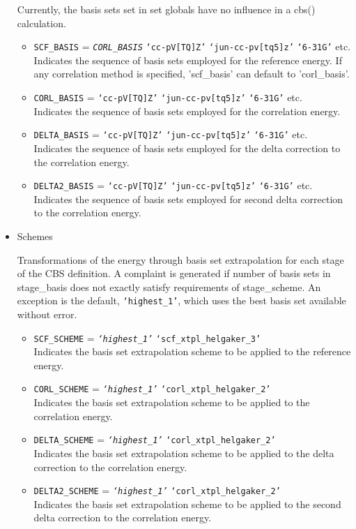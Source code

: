 \begin{itemize}
Currently, the basis sets set in set globals have no influence in a cbs() calculation.
\begin{itemize}
\item[] \texttt{SCF\_BASIS} = \texttt{\textit{CORL\_BASIS}} \textbar\; \texttt{`cc-pV[TQ]Z'} \textbar\; \texttt{`jun-cc-pv[tq5]z'} \textbar\; \texttt{`6-31G'} \textbar\; etc. \\
Indicates the sequence of basis sets employed for the reference energy. If any correlation method is specified, 'scf\_basis' can default to 'corl\_basis'.
\item[] \texttt{CORL\_BASIS} = \texttt{`cc-pV[TQ]Z'} \textbar\; \texttt{`jun-cc-pv[tq5]z'} \textbar\; \texttt{`6-31G'} \textbar\; etc. \\
Indicates the sequence of basis sets employed for the correlation energy.
\item[] \texttt{DELTA\_BASIS} = \texttt{`cc-pV[TQ]Z'} \textbar\; \texttt{`jun-cc-pv[tq5]z'} \textbar\; \texttt{`6-31G'} \textbar\; etc. \\
Indicates the sequence of basis sets employed for the delta correction to the correlation energy.
\item[] \texttt{DELTA2\_BASIS} = \texttt{`cc-pV[TQ]Z'} \textbar\; \texttt{`jun-cc-pv[tq5]z'} \textbar\; \texttt{`6-31G'} \textbar\; etc. \\
Indicates the sequence of basis sets employed for second delta correction to the correlation energy.
\end{itemize}

\item Schemes

Transformations of the energy through basis set extrapolation for each stage of the CBS definition. 
A complaint is generated if number of basis sets in stage\_basis does not exactly satisfy 
requirements of stage\_scheme. 
An exception is the default, \texttt{`highest\_1'}, which uses the best basis set available without error.
\begin{itemize}
\item[] \texttt{SCF\_SCHEME} = \texttt{\textit{`highest\_1'}} \textbar\; \texttt{`scf\_xtpl\_helgaker\_3'} \\
Indicates the basis set extrapolation scheme to be applied to the reference energy.
\item[] \texttt{CORL\_SCHEME} = \texttt{\textit{`highest\_1'}} \textbar\; \texttt{`corl\_xtpl\_helgaker\_2'} \\
Indicates the basis set extrapolation scheme to be applied to the correlation energy.
\item[] \texttt{DELTA\_SCHEME} = \texttt{\textit{`highest\_1'}} \textbar\; \texttt{`corl\_xtpl\_helgaker\_2'} \\
Indicates the basis set extrapolation scheme to be applied to the delta correction to the correlation energy.
\item[] \texttt{DELTA2\_SCHEME} = \texttt{\textit{`highest\_1'}} \textbar\; \texttt{`corl\_xtpl\_helgaker\_2'} \\
Indicates the basis set extrapolation scheme to be applied to the second delta correction to the correlation energy.
\end{itemize}
\end{itemize}

